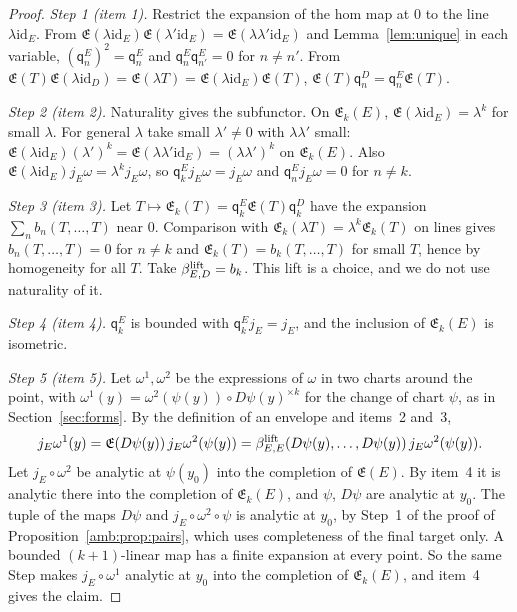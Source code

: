 \documentclass[11pt]{amsart}
\theoremstyle{definition}
\theoremstyle{remark}
\numberwithin{equation}{section}
\newcommand{\id}{\mathrm{id}}
\theoremstyle{plain}
\theoremstyle{definition}
\theoremstyle{plain}
\begin{document}
\begin{proof}
\emph{Step 1 (item 1).} Restrict the expansion of the hom map at $0$ to the line $\lambda\id_E$. From $\mathfrak E(\lambda\id_E)\mathfrak E(\lambda'\id_E)=\mathfrak E(\lambda\lambda'\id_E)$ and Lemma~\ref{lem:unique} in each variable, $(\mathsf q_n^E)^2=\mathsf q_n^E$ and $\mathsf q_n^E\mathsf q_{n'}^E=0$ for $n\ne n'$. From $\mathfrak E(T)\mathfrak E(\lambda\id_D)=\mathfrak E(\lambda T)=\mathfrak E(\lambda\id_E)\mathfrak E(T)$, $\mathfrak E(T)\mathsf q_n^D=\mathsf q_n^E\mathfrak E(T)$.

\emph{Step 2 (item 2).} Naturality gives the subfunctor. On $\mathfrak E_k(E)$, $\mathfrak E(\lambda\id_E)=\lambda^k$ for small $\lambda$. For general $\lambda$ take small $\lambda'\ne0$ with $\lambda\lambda'$ small: $\mathfrak E(\lambda\id_E)(\lambda')^k=\mathfrak E(\lambda\lambda'\id_E)=(\lambda\lambda')^k$ on $\mathfrak E_k(E)$. Also $\mathfrak E(\lambda\id_E)j_E\omega=\lambda^kj_E\omega$, so $\mathsf q_k^Ej_E\omega=j_E\omega$ and $\mathsf q_n^Ej_E\omega=0$ for $n\ne k$.

\emph{Step 3 (item 3).} Let $T\mapsto\mathfrak E_k(T)=\mathsf q_k^E\mathfrak E(T)\mathsf q_k^D$ have the expansion $\sum_nb_n(T,\dots,T)$ near $0$. Comparison with $\mathfrak E_k(\lambda T)=\lambda^k\mathfrak E_k(T)$ on lines gives $b_n(T,\dots,T)=0$ for $n\ne k$ and $\mathfrak E_k(T)=b_k(T,\dots,T)$ for small $T$, hence by homogeneity for all $T$. Take $\beta^{\rm lift}_{E,D}=b_k$. This lift is a choice, and we do not use naturality of it.

\emph{Step 4 (item 4).} $\mathsf q_k^E$ is bounded with $\mathsf q_k^Ej_E=j_E$, and the inclusion of $\mathfrak E_k(E)$ is isometric.

\emph{Step 5 (item 5).} Let $\omega^1,\omega^2$ be the expressions of $\omega$ in two charts around the point, with $\omega^1(y)=\omega^2(\psi(y))\circ D\psi(y)^{\times k}$ for the change of chart $\psi$, as in Section~\ref{sec:forms}. By the definition of an envelope and items~2 and~3,
\[
 j_E\omega^1(y)=\mathfrak E(D\psi(y))\,j_E\omega^2(\psi(y))=\beta^{\rm lift}_{E,E}(D\psi(y),\dots,D\psi(y))\,j_E\omega^2(\psi(y)).
\]
Let $j_E\circ\omega^2$ be analytic at $\psi(y_0)$ into the completion of $\mathfrak E(E)$. By item~4 it is analytic there into the completion of $\mathfrak E_k(E)$, and $\psi$, $D\psi$ are analytic at $y_0$. The tuple of the maps $D\psi$ and $j_E\circ\omega^2\circ\psi$ is analytic at $y_0$, by Step~1 of the proof of Proposition~\ref{amb:prop:pairs}, which uses completeness of the final target only. A bounded $(k+1)$-linear map has a finite expansion at every point. So the same Step makes $j_E\circ\omega^1$ analytic at $y_0$ into the completion of $\mathfrak E_k(E)$, and item~4 gives the claim.
\end{proof}
\end{document}
